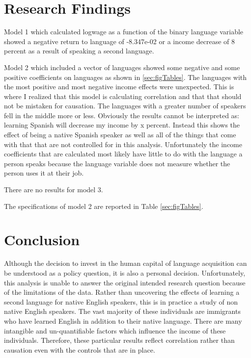 \documentclass[12pt,english]{article}
\begin{document}
\section{Research Findings}\label{sec:results}
Model 1 which calculated logwage as a function of the binary language variable showed a negative return to language of -8.347e-02 or a income decrease of 8 percent as a result of speaking a second language.  

Model 2 which included a vector of languages showed some negative and some positive coefficients on languages as shown in \ref{sec:figTables}. The languages with the most positive and most negative income effects were unexpected. This is where I realized that this model is calculating correlation and that that should not be mistaken for causation. The languages with a greater number of speakers fell in the middle more or less. Obviously the results cannot be interpreted as: learning Spanish will decrease my income by x percent. Instead this shows the effect of being a native Spanish speaker as well as all of the things that come with that that are not controlled for in this analysis. Unfortunately the income coefficients that are calculated most likely have little to do with the language a person speaks because the language variable does not measure whether the person uses it at their job. 

There are no results for model 3. 

The specifications of model 2 are reported in Table \ref{sec:figTables}.



\section{Conclusion}\label{sec:conclusion}
Although the decision to invest in the human capital of language acquisition can be understood as a policy question, it is also a personal decision. Unfortunately, this analysis is unable to answer the original intended research question because of the limitations of the data. Rather than uncovering the effects of learning a second language for native English speakers, this is in practice a study of non native English speakers. The vast majority of these individuals are immigrants who have learned English in addition to their native language. There are many intangible and un-quantifiable factors which influence the income of these individuals. Therefore, these particular results reflect correlation rather than causation even with the controls that are in place. 
\end{document}
